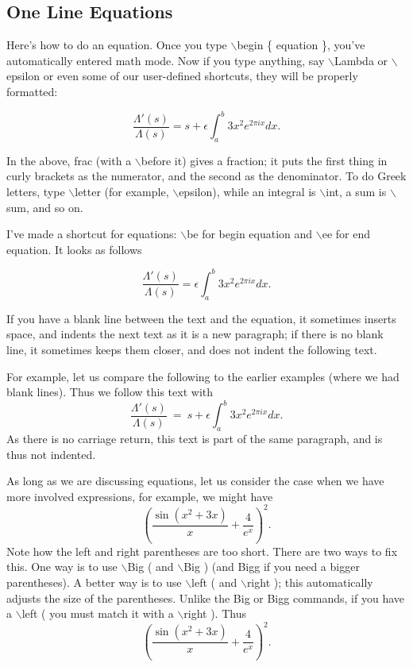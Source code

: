 \documentclass[12pt,reqno]{amsart}
\newcommand\be{\begin{equation}}
\newcommand\ee{\end{equation}}
\numberwithin{equation}{section}
\begin{document}
\subsection{One Line Equations}

Here's how to do an equation. Once you type $\backslash$begin \{
equation \}, you've automatically entered math mode. Now if you
type anything, say $\backslash$Lambda or $\backslash$epsilon or
even some of our user-defined shortcuts, they will be properly
formatted:

\begin{equation}
\frac{\Lambda'(s)}{\Lambda(s)} = s + \epsilon \int_a^b 3x^2
e^{2\pi i x} dx.
\end{equation}

In the above, frac (with a $\backslash$before it) gives a
fraction; it puts the first thing in curly brackets as the
numerator, and the second as the denominator. To do Greek letters,
type $\backslash$letter (for example, $\backslash$epsilon), while
an integral is $\backslash$int, a sum is $\backslash$sum, and so
on.

I've made a shortcut for equations: $\backslash$be for begin
equation and $\backslash$ee for end equation. It looks as follows

\be \frac{\Lambda'(s)}{\Lambda(s)} = \epsilon \int_a^b 3x^2
e^{2\pi i x} dx. \ee

If you have a blank line between the text and the equation, it
sometimes inserts space, and indents the next text as it is a new
paragraph; if there is no blank line, it sometimes keeps them
closer, and does not indent the following text.

For example, let us compare the following to the earlier examples
(where we had blank lines). Thus we follow this text with
\begin{equation} \frac{\Lambda'(s)}{\Lambda(s)}\ =\ s + \epsilon
\int_a^b 3x^2 e^{2\pi i x} dx.
\end{equation} As there is no carriage return, this text is part
of the same paragraph, and is thus not indented.

As long as we are discussing equations, let us consider the case
when we have more involved expressions, for example, we might have
\begin{equation} (\frac{\sin(x^2+3x)}{x}+\frac{4}{e^x})^2.
\end{equation} Note how the left and right parentheses are too
short. There are two ways to fix this. One way is to use
$\backslash$Big ( and $\backslash$Big ) (and Bigg if you need a
bigger parentheses). A better way is to use $\backslash$left ( and
$\backslash$right ); this automatically adjusts the size of the
parentheses. Unlike the Big or Bigg commands, if you have a
$\backslash$left ( you must match it with a $\backslash$right ).
Thus
\begin{equation}
\left(\frac{\sin(x^2+3x)}{x}+\frac{4}{e^x}\right)^2.
\end{equation}
\end{document}
